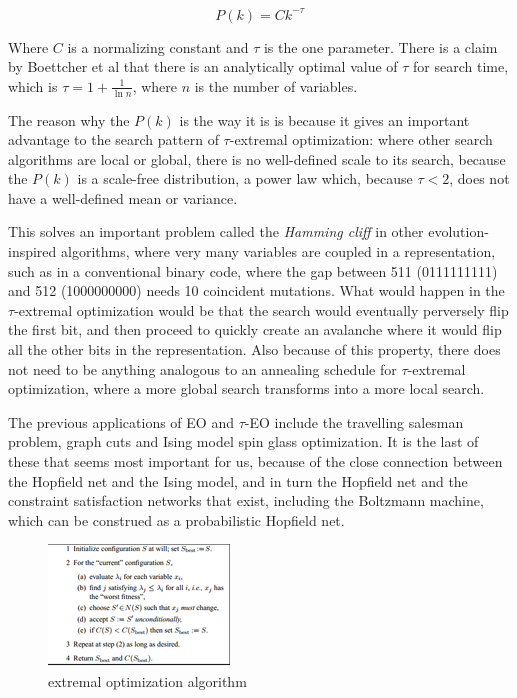 \documentclass[12pt]{article}
\begin{document}
$$P(k) = Ck^{-\tau}$$

Where $C$ is a normalizing constant and $\tau$ is the one parameter. There is a claim by Boettcher et al that there is an analytically optimal value of $\tau$ for search time, which is $\tau = 1 + \frac{1}{\ln n}$, where $n$ is the number of variables.%


The reason why the $P(k)$ is the way it is is because it gives an important advantage to the search pattern of $\tau$-extremal optimization: where other search algorithms are local or global, there is no well-defined scale to its search, because the $P(k)$ is a scale-free distribution, a power law which, because $\tau < 2$, does not have a well-defined mean or variance.

This solves an important problem called the \emph{Hamming cliff} in other evolution-inspired algorithms, where very many variables are coupled in a representation, such as in a conventional binary code, where the gap between 511 (0111111111) and 512 (1000000000) needs 10 coincident mutations. What would happen in the $\tau$-extremal optimization would be that the search would eventually perversely flip the first bit, and then proceed to quickly create an avalanche where it would flip all the other bits in the representation. Also because of this property, there does not need to be anything analogous to an annealing schedule for $\tau$-extremal optimization, where a more global search transforms into a more local search.

The previous applications of EO and $\tau$-EO include the travelling salesman problem, graph cuts and Ising model spin glass optimization. It is the last of these that seems most important for us, because of the close connection between the Hopfield net and the Ising model, and in turn the Hopfield net and the constraint satisfaction networks that exist, including the Boltzmann machine, which can be construed as a probabilistic Hopfield net.

\begin{figure}
  \includegraphics{eo_alg} %
  \caption{extremal optimization algorithm}
\end{figure}
\end{document}

